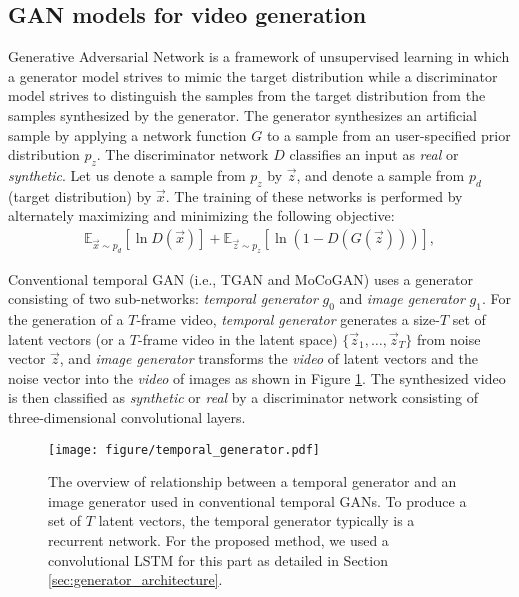 \documentclass[twocolumn]{svjour3}
\def\Fig#1{Figure \ref{fig:#1}}
\def\Sec#1{Section \ref{sec:#1}}
\begin{document}
\subsection{GAN models for video generation}
Generative Adversarial Network is a framework of unsupervised learning in which a generator model strives to mimic the target distribution while a discriminator model strives to distinguish the samples from the target distribution from the samples synthesized by the generator.
The generator synthesizes an artificial sample by applying a network function $G$ to a sample from an user-specified prior distribution $p_z$.
The discriminator network $D$ classifies an input as \textit{real} or \textit{synthetic}.
Let us denote a sample from $p_z$ by $ \vec{z}$, and denote a sample from $p_d$ (target distribution) by $\vec{x}$.
The training of these networks is performed by
alternately maximizing and minimizing the following objective:
\begin{align}
\label{eqn:GAN}
    \mathbb{E}_{\vec{x} \sim p_d}[\ln D(\vec{x})] +
    \mathbb{E}_{\vec{z} \sim p_z}[\ln (1 - D(G(\vec{z})))],
\end{align}







Conventional temporal GAN (i.e., TGAN and MoCoGAN) uses a generator consisting of two sub-networks: {\em temporal generator} $g_0$ and {\em image generator} $g_1$.
For the generation of a $T$-frame video, {\em temporal generator} generates a size-$T$ set of latent vectors (or a $T$-frame video in the latent space)
$\{\vec{z}_1, \dots, \vec{z}_T\}$ from noise vector $\vec{z}$, and {\em image generator} transforms the \textit{video} of latent vectors and the noise vector into the \textit{video} of images as shown in \Fig{temporal_generator}.
The synthesized video is then classified as \textit{synthetic} or \textit{real} by a discriminator network consisting of three-dimensional convolutional layers.

\begin{figure}[t]
\centering
  \texttt{[image: figure/temporal\_generator.pdf]}
  \caption{The overview of relationship between a temporal generator and an image generator used in conventional temporal GANs. To produce a set of $T$ latent vectors, the temporal generator typically is a recurrent network. For the proposed method, we used a convolutional LSTM for this part as detailed in \Sec{generator_architecture}.}
  \label{fig:temporal_generator}

\end{figure}
\end{document}
